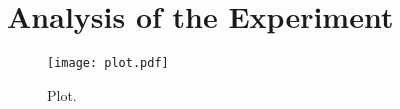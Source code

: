 \section{Analysis of the Experiment}
\label{sec:Auswertung}

\begin{figure}
  \centering
  \texttt{[image: plot.pdf]}
  \caption{Plot.}
  \label{fig:plot}
\end{figure}
